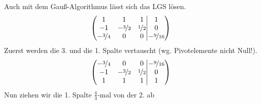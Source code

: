 \documentclass[11pt,a4paper,DIV=12]{scrartcl}
\begin{document}
%
%
%
Auch mit dem Gauß-Algorithmus lässt sich das LGS lösen.
%
%
%
\begin{gather}
	\left\lparen
	\begin{matrix}
		1 & 1 & 1 \\
		-1 & -\nicefrac{3}{2} & \nicefrac{1}{2} \\
		-\nicefrac{3}{4} & 0 & 0
	\end{matrix}
	\middle\vert
	\begin{matrix}
		1 \\
		0 \\
		-\nicefrac{9}{16}
	\end{matrix}
	\right\rparen
\end{gather}
%
%
%
Zuerst werden die 3. und die 1. Spalte vertauscht (wg. Pivotelemente nicht Null!).
%
%
%
\begin{gather}
	\left\lparen
	\begin{matrix}
		-\nicefrac{3}{4} & 0 & 0 \\
		-1 & -\nicefrac{3}{2} & \nicefrac{1}{2} \\
		1 & 1 & 1
	\end{matrix}
	\middle\vert
	\begin{matrix}
		-\nicefrac{9}{16} \\
		0 \\
		1
	\end{matrix}
	\right\rparen
\end{gather}
%
%
%
Nun ziehen wir die 1. Spalte $\frac{4}{3}$-mal von der 2. ab
\end{document}
